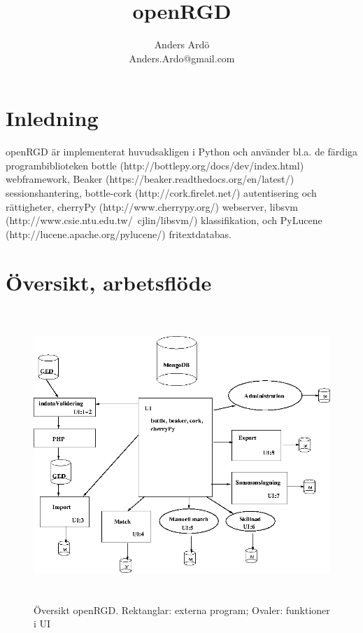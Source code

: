 \documentclass[swedish,11pt]{article}
\title{openRGD}
\author{Anders Ardö\\Anders.Ardo@gmail.com}
\begin{document}
\maketitle

\section{Inledning}
openRGD är implementerat huvudsakligen i Python och använder
bl.a. de färdiga programbiblioteken bottle (http://bottlepy.org/docs/dev/index.html) webframework,
Beaker (https://beaker.readthedocs.org/en/latest/)
sessionshantering, bottle-cork (http://cork.firelet.net/)
autentisering och rättigheter, 
cherryPy (http://www.cherrypy.org/) webserver, libsvm
(http://www.csie.ntu.edu.tw/~cjlin/libsvm/) klassifikation, och PyLucene
(http://lucene.apache.org/pylucene/) fritextdatabas.

\section{Översikt, arbetsflöde}
\begin{figure}[htb]
\includegraphics[width=\textwidth,height=11cm]{openRGD}
\caption{Översikt openRGD. Rektanglar: externa program; Ovaler:
  funktioner i UI}
\end{figure}
\end{document}
